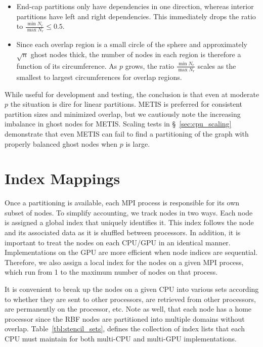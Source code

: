 \documentclass{report}
\begin{document}
\begin{itemize} 
\item End-cap partitions only have dependencies in one direction, whereas interior partitions have left and right dependencies. This immediately drops the ratio to $\frac{\min N_r}{\max N_r} \leq 0.5$. 
\item Since each overlap region is a small circle of the sphere and approximately $\sqrt{n}$ ghost nodes thick, the number of nodes in each region is therefore a function of its circumference. As $p$ grows, the ratio $\frac{\min N_r}{\max N_r}$ scales as the smallest to largest circumferences for overlap regions. 
\end{itemize}
While useful for development and testing, the conclusion is that even at moderate $p$ the situation is dire for linear partitions. METIS is preferred for consistent partition sizes and minimized overlap, but we cautiously note the increasing imbalance in ghost nodes for METIS. Scaling tests in \S~\ref{sec:cpu_scaling} demonstrate that even METIS can fail to find a partitioning of the graph with properly balanced ghost nodes when $p$ is large.  

% 


\section{Index Mappings}

Once a partitioning is available, each MPI process is responsible for its own subset of nodes. 
To simplify accounting, we track nodes in two ways. Each node is assigned
a global index that uniquely identifies it. This index follows the node 
and its associated data as it is shuffled between processors. In addition, 
it is important to treat the nodes on each CPU/GPU in an identical manner. 
Implementations on the GPU are more efficient when node indices
are sequential. Therefore, we also assign a local index for the nodes on 
a given MPI process, which run from 1 to the maximum number of nodes on that process. 


It is convenient to break up the nodes on a given CPU into various sets
according to whether they are sent to other processors, are retrieved from 
other processors, are permanently on the processor, etc. Note as well, 
that each node has a home processor since the RBF nodes are partitioned into 
multiple domains without overlap.
Table~\ref{tbl:stencil_sets}, defines the collection of index lists that each CPU must maintain for both multi-CPU and multi-GPU implementations.  
\end{document}
